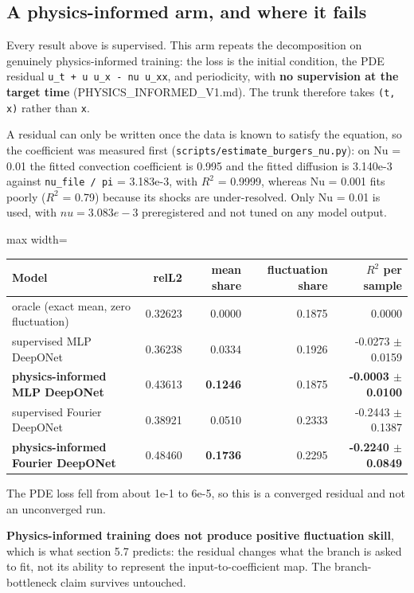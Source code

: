 \documentclass[preprint,12pt]{elsarticle}
\begin{document}
\subsection{A physics-informed arm, and where it fails}

Every result above is supervised. This arm repeats the decomposition on genuinely physics-informed training: the loss is the initial condition, the PDE residual \texttt{u\_t + u u\_x - nu u\_xx}, and periodicity, with \textbf{no supervision at the target time} (PHYSICS\_INFORMED\_V1.md). The trunk therefore takes \texttt{(t, x)} rather than \texttt{x}.

A residual can only be written once the data is known to satisfy the equation, so the coefficient was measured first (\texttt{scripts/estimate\_burgers\_nu.py}): on Nu = 0.01 the fitted convection coefficient is 0.995 and the fitted diffusion is 3.140e-3 against \texttt{nu\_file / pi} = 3.183e-3, with $R^2$ = 0.9999, whereas Nu = 0.001 fits poorly ($R^2$ = 0.79) because its shocks are under-resolved. Only Nu = 0.01 is used, with $nu = 3.083e-3$ preregistered and not tuned on any model output.

\begin{center}
\begin{adjustbox}{max width=\linewidth}
\small
\begin{tabular}{lrrrr}
\toprule
Model & relL2 & mean share & fluctuation share & \textbf{$R^2$ per sample} \\
\midrule
oracle (exact mean, zero fluctuation) & 0.32623 & 0.0000 & 0.1875 & 0.0000 \\
supervised MLP DeepONet & 0.36238 & 0.0334 & 0.1926 & -0.0273 $\pm$ 0.0159 \\
\textbf{physics-informed MLP DeepONet} & 0.43613 & \textbf{0.1246} & 0.1875 & \textbf{-0.0003 $\pm$ 0.0100} \\
supervised Fourier DeepONet & 0.38921 & 0.0510 & 0.2333 & -0.2443 $\pm$ 0.1387 \\
\textbf{physics-informed Fourier DeepONet} & 0.48460 & \textbf{0.1736} & 0.2295 & \textbf{-0.2240 $\pm$ 0.0849} \\
\bottomrule
\end{tabular}
\end{adjustbox}
\end{center}


The PDE loss fell from about 1e-1 to 6e-5, so this is a converged residual and not an unconverged run.

\textbf{Physics-informed training does not produce positive fluctuation skill}, which is what section 5.7 predicts: the residual changes what the branch is asked to fit, not its ability to represent the input-to-coefficient map. The branch-bottleneck claim survives untouched.
\end{document}
